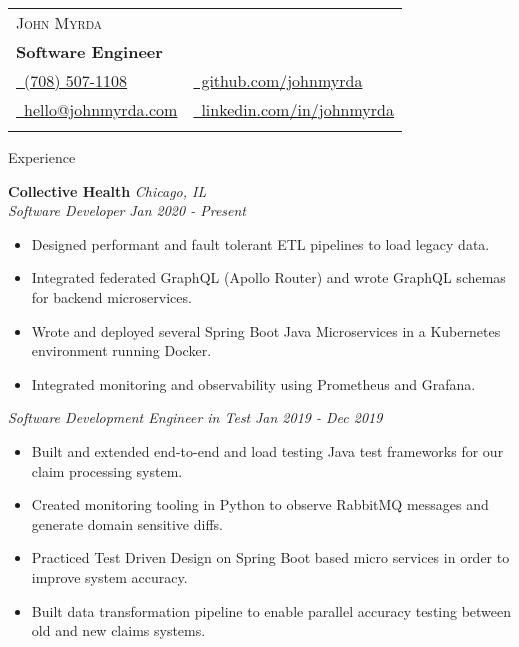 \documentclass{article}
\newenvironment{changemargin}[2]{%
  \begin{list}{}{%
    \setlength{\topsep}{0pt}%
    \setlength{\leftmargin}{#1}%
    \setlength{\rightmargin}{#2}%
    \setlength{\listparindent}{\parindent}%
    \setlength{\itemindent}{\parindent}%
    \setlength{\parsep}{\parskip}%
  }%
  \item[]}{\end{list}
}
\newcommand{\lineover}{
	\begin{changemargin}{-0.05in}{-0.05in}
		\vspace*{-8pt}
		\hrulefill \\
		\vspace*{-2pt}
	\end{changemargin}
}
\newcommand{\header}[1]{
	\begin{changemargin}{-0.5in}{-0.5in}
		\scshape{#1}\\
  	\lineover
	\end{changemargin}
}
\newcommand{\contact}[7]{
	\begin{changemargin}{-0.5in}{-0.5in}
		\begin{tabular}{l l}
			\Large \scshape {#1}\\
			\textbf{#2}\\
			{#3} & {#5}\\ 
			{#4} & {#6}\\
			 & {#7}\\
		\end{tabular}
	\end{changemargin}
}
\newenvironment{body} {
	\vspace*{-16pt}
	\begin{changemargin}{-0.25in}{-0.5in}
  }	
	{\end{changemargin}
}
\begin{document}
\contact{John Myrda}
{Software Engineer}
{\href{tel:7085071108}{\faPhone\ (708) 507-1108}}
{\href{mailto:hello@johnmyrda.com}{\faEnvelope\ hello@johnmyrda.com}}
{\href{https://github.com/johnmyrda/resume}{\faGithub\ github.com/johnmyrda}}
{\href{https://www.linkedin.com/in/johnmyrda}{\faLinkedin\ linkedin.com/in/johnmyrda}}

\header{Experience}


\begin{body}

	\vspace{20pt}

	\textbf{Collective Health} \hfill \emph{Chicago, IL}\\
	\emph{Software Developer} \hfill \emph{Jan 2020 - Present}\\
	\begin{itemize} \itemsep -0pt  %
	    \item Designed performant and fault tolerant ETL pipelines to load legacy data.
	    \item Integrated federated GraphQL (Apollo Router) and wrote GraphQL schemas for backend microservices.
	    \item Wrote and deployed several Spring Boot Java Microservices in a Kubernetes environment running Docker.
	    \item Integrated monitoring and observability using Prometheus and Grafana.
	\end{itemize}		
	\emph{Software Development Engineer in Test} \hfill \emph{Jan 2019 - Dec 2019}\\
	\begin{itemize} \itemsep -0pt  %
	    \item Built and extended end-to-end and load testing Java test frameworks for our claim processing system.
	    \item Created monitoring tooling in Python to observe RabbitMQ messages and generate domain sensitive diffs.
	    \item Practiced Test Driven Design on Spring Boot based micro services in order to improve system accuracy.
	    \item Built data transformation pipeline to enable parallel accuracy testing between old and new claims systems.
	\end{itemize}	


\end{body}
\end{document}
